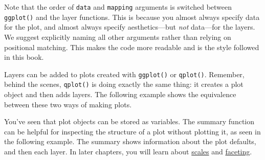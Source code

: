 Note that the order of \texttt{data} and \texttt{mapping} arguments is
switched between \texttt{ggplot()} and the layer functions. This is
because you almost always specify data for the plot, and almost always
specify aesthetics---but \emph{not} data---for the layers. We suggest
explicitly naming all other arguments rather than relying on positional
matching. This makes the code more readable and is the style followed in
this book.

Layers can be added to plots created with \texttt{ggplot()} or
\texttt{qplot()}. Remember, behind the scenes, \texttt{qplot()} is doing
exactly the same thing: it creates a plot object and then adds layers.
The following example shows the equivalence between these two ways of
making plots.

\begin{Shaded}
\begin{Highlighting}[]
\StringTok{ }\StringTok{ }
\StringTok{  }\NormalTok{()}
\StringTok{ } 

\StringTok{ } \StringTok{ }
\StringTok{  }\NormalTok{()}
\StringTok{ } 
   \NormalTok{(}\NormalTok{, }\NormalTok{))}
\StringTok{ }\StringTok{ }
\StringTok{  }\NormalTok{() +}\StringTok{ }\NormalTok{()}
\end{Highlighting}
\end{Shaded}

You've seen that plot objects can be stored as variables. The summary
function can be helpful for inspecting the structure of a plot without
plotting it, as seen in the following example.
 The summary shows information about the
plot defaults, and then each layer. In later chapters, you will learn
about \hyperref[cha:scales]{scales} and
\hyperref[cha:position]{faceting}.

